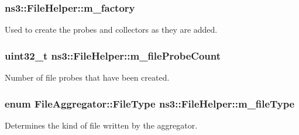 \subsubsection[{\texorpdfstring{m\+\_\+factory}{m_factory}}]{ ns3\+::\+File\+Helper\+::m\+\_\+factory\hspace{0.3cm}{\ttfamily [private]}}\hypertarget{classns3_1_1FileHelper_a5bd6b19fd7ddd11b84e351185d6d6c8c}{}\label{classns3_1_1FileHelper_a5bd6b19fd7ddd11b84e351185d6d6c8c}


Used to create the probes and collectors as they are added. 

\subsubsection[{\texorpdfstring{m\+\_\+file\+Probe\+Count}{m_fileProbeCount}}]{\setlength{\rightskip}{0pt plus 5cm}uint32\+\_\+t ns3\+::\+File\+Helper\+::m\+\_\+file\+Probe\+Count\hspace{0.3cm}{\ttfamily [private]}}\hypertarget{classns3_1_1FileHelper_a5ecc1318b7c9a79af79f869fe1e7ceac}{}\label{classns3_1_1FileHelper_a5ecc1318b7c9a79af79f869fe1e7ceac}


Number of file probes that have been created. 

\subsubsection[{\texorpdfstring{m\+\_\+file\+Type}{m_fileType}}]{\setlength{\rightskip}{0pt plus 5cm}enum {\bf File\+Aggregator\+::\+File\+Type} ns3\+::\+File\+Helper\+::m\+\_\+file\+Type\hspace{0.3cm}{\ttfamily [private]}}\hypertarget{classns3_1_1FileHelper_a3bd3c31ac1083d2bee0b0987b0a1323f}{}\label{classns3_1_1FileHelper_a3bd3c31ac1083d2bee0b0987b0a1323f}


Determines the kind of file written by the aggregator. 


